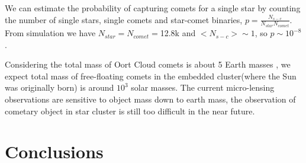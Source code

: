 \documentclass[usenatbib]{mn2e}
\begin{document}
We can estimate the probability of capturing comets for a single star by counting the number of single stars, single comets and star-comet binaries, $p = \frac{N_{s-c}}{N_{star}N_{comet}} $. From simulation we have $ N_{star} = N_{comet} = $12.8k and $<N_{s-c}> \sim 1$, so $ p \sim10^{-8}$.

Considering the total mass of Oort Cloud comets is about 5 Earth masses \citep{Morbidelli:2005aa}, we expect total mass of free-floating comets in the embedded cluster(where the Sun was originally born) is around $10^{3}$ solar masses. The current micro-lensing observations are sensitive to object mass down to earth mass, the observation of cometary object in star cluster is still too difficult in the near future.











\section{Conclusions}\label{section:conclusions}

%
\end{document}
